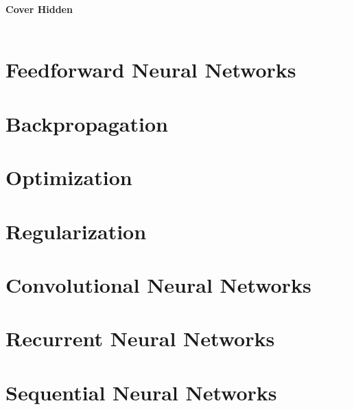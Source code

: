 \documentclass[11pt,fleqn,oneside]{book} %
\newcommand{\AUTHOR}{Federico Brancasi}
\newcommand{\DATE}{\today}
\newcommand{\TITLE}{Deep Learning}
\newcommand{\SUBTITLE}{University of Trento}
\newcommand{\SUBJECT}{Demo}
\renewcommand{\coverpage}[5]{{\Huge\textbf{Cover Hidden}}
    \textcolor{white}{#1, #2, #3, #4, #5}}
\begin{document}

\coverpage{\TITLE}{\SUBTITLE}{\AUTHOR}{\DATE}{\SUBJECT}

\newpage
\tableofcontents


\newpage
\chapter{Feedforward Neural Networks} 


\newpage
\chapter{Backpropagation} 


\newpage
\chapter{Optimization}


\newpage
\chapter{Regularization}


\newpage
\chapter{Convolutional Neural Networks}


\newpage
\chapter{Recurrent Neural Networks}


\newpage
\chapter{Sequential Neural Networks}

\end{document}

